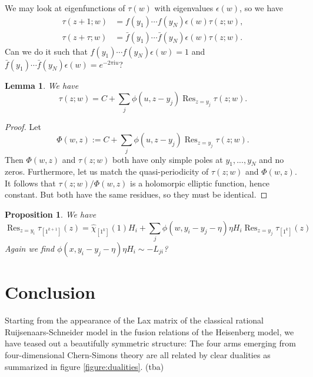 \documentclass[11pt]{report}
\newtheorem{lemma}[theorem]{Lemma}
\newtheorem{prop}[theorem]{Proposition}
\theoremstyle{definition}
\theoremstyle{remark}
\theoremstyle{remark}
\newcommand{\I}{\mathrm{i}}
\begin{document}
We may look at eigenfunctions of $\tau(w)$ with eigenvalues $\epsilon(w)$, so we have
\begin{align*}
\tau(z+1;w) &= f(y_1) \cdots f(y_N) \epsilon(w) \tau(z;w), \\
\tau(z+\tau;w) &= \bar f(y_1) \cdots \bar f(y_N) \epsilon(w) \tau(z;w).
\end{align*}
Can we do it such that $f(y_1) \cdots f(y_N) \epsilon(w) = 1$ and $\bar f(y_1) \cdots \bar f(y_N) \epsilon(w) = e^{-2\pi\I u}$?

\begin{lemma}
We have
\begin{equation*}
\tau(z;w) = C + \sum_j \phi(u,z-y_j) \operatorname{Res}_{z=y_j} \tau(z;w).
\end{equation*}
\end{lemma}

\begin{proof}
Let
\begin{equation*}
\Phi(w,z) := C + \sum_j \phi(u,z-y_j) \operatorname{Res}_{z=y_j} \tau(z;w).
\end{equation*}
Then $\Phi(w,z)$ and $\tau(z;w)$ both have only simple poles at $y_1,...,y_N$ and no zeros. Furthermore, let us match the quasi-periodicity of $\tau(z;w)$ and $\Phi(w,z)$. It follows that $\tau(z;w)/\Phi(w,z)$ is a holomorpic elliptic function, hence constant. But both have the same residues, so they must be identical.
\end{proof}

\begin{prop}
We have
\begin{equation*}
\operatorname{Res}_{z=y_i} \tau_{[1^{k+1}]}(z) = \widehat{\chi}_{[1^k]}(1) H_i + \sum_j \phi(w,y_i-y_j-\eta) \eta H_i \operatorname{Res}_{z=y_j} \tau_{[1^k]}(z)
\end{equation*}
Again we find $\phi(x,y_i-y_j-\eta) \eta H_i \sim -L_{ji}$?
\end{prop}

\chapter{Conclusion}\label{chapter:conclusion}

Starting from the appearance of the Lax matrix of the classical rational Ruijsenaars-Schneider model in the fusion relations of the Heisenberg model, we have teased out a beautifully symmetric structure: The four arms emerging from four-dimensional Chern-Simons theory are all related by clear dualities as summarized in figure \ref{figure:dualities}. (tba)
\end{document}

